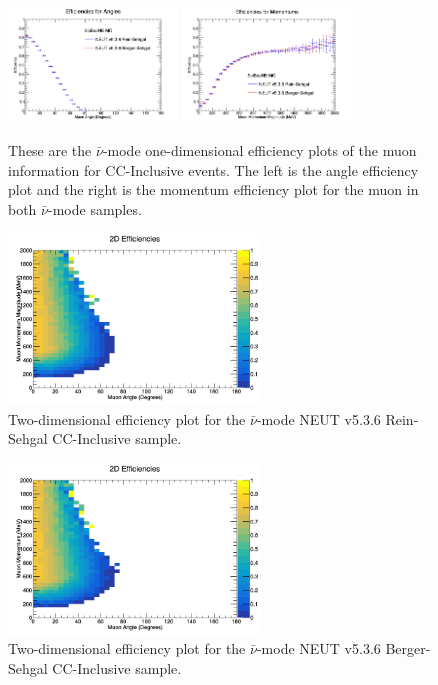 \documentclass[11pt]{article}
\begin{document}
\begin{figure}[H]
\centering
\includegraphics[width=0.4\textwidth]{ANMCombinedPlotsImages/15-ANMCombinedPlots.png}
\includegraphics[width=0.4\textwidth]{ANMCombinedPlotsImages/16-ANMCombinedPlots.png}
\caption{These are the $\bar{\nu}$-mode one-dimensional efficiency plots of the muon information for CC-Inclusive events. The left is the angle efficiency plot and the right is the momentum efficiency plot for the muon in both $\bar{\nu}$-mode samples.}
\label{fig:app:ANMCCInclusive1DEff}
\end{figure}

\begin{figure}[H]
\centering
\includegraphics[width=0.6\textwidth]{CCInclusivePlots/2DEffCompareANMRS.png}
\caption{Two-dimensional efficiency plot for the $\bar{\nu}$-mode NEUT v5.3.6 Rein-Sehgal CC-Inclusive sample.}
\label{fig:app:ANMCCInclusiveMuon2DEffRS}
\end{figure}

\begin{figure}[H]
\centering
\includegraphics[width=0.6\textwidth]{CCInclusivePlots/2DEffCompareANMBS.png}
\caption{Two-dimensional efficiency plot for the $\bar{\nu}$-mode NEUT v5.3.6 Berger-Sehgal CC-Inclusive sample.}
\label{fig:app:ANMCCInclusiveMuon2DEffBS}
\end{figure}
\end{document}
